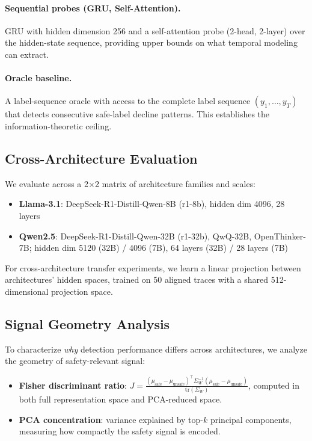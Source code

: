 \documentclass[11pt,a4paper]{article}
\begin{document}
\paragraph{Sequential probes (GRU, Self-Attention).}
GRU with hidden dimension 256 and a self-attention probe (2-head, 2-layer) over the hidden-state sequence, providing upper bounds on what temporal modeling can extract.

\paragraph{Oracle baseline.}
A label-sequence oracle with access to the complete label sequence $(y_1, \ldots, y_T)$ that detects consecutive safe-label decline patterns. This establishes the information-theoretic ceiling.

\subsection{Cross-Architecture Evaluation}

We evaluate across a 2$\times$2 matrix of architecture families and scales:
\begin{itemize}
\item \textbf{Llama-3.1}: DeepSeek-R1-Distill-Qwen-8B (r1-8b), hidden dim 4096, 28 layers
\item \textbf{Qwen2.5}: DeepSeek-R1-Distill-Qwen-32B (r1-32b), QwQ-32B, OpenThinker-7B; hidden dim 5120 (32B) / 4096 (7B), 64 layers (32B) / 28 layers (7B)
\end{itemize}

For cross-architecture transfer experiments, we learn a linear projection between architectures' hidden spaces, trained on 50 aligned traces with a shared 512-dimensional projection space.

\subsection{Signal Geometry Analysis}

To characterize \emph{why} detection performance differs across architectures, we analyze the geometry of safety-relevant signal:
\begin{itemize}
\item \textbf{Fisher discriminant ratio}: $J = \frac{(\mu_{\text{safe}} - \mu_{\text{unsafe}})^\top \Sigma_W^{-1} (\mu_{\text{safe}} - \mu_{\text{unsafe}})}{\text{tr}(\Sigma_W)}$, computed in both full representation space and PCA-reduced space.
\item \textbf{PCA concentration}: variance explained by top-$k$ principal components, measuring how compactly the safety signal is encoded.
\end{itemize}
\end{document}
